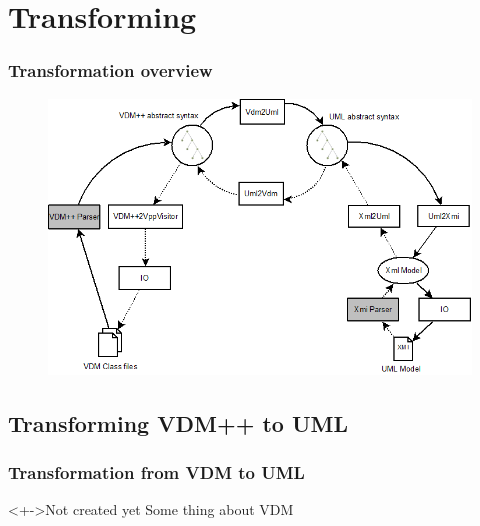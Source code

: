 
\section{Transforming}
%
%
\frame
{
  \frametitle{Transformation overview}

\begin{center}
\begin{figure}
\includegraphics[width=\textwidth]{images/OverviewOverMapping.png}
\end{figure}
\end{center}
}
\subsection{Transforming VDM++ to UML}

%
%
\frame
{
  \frametitle{Transformation from VDM to UML}

\begin{center}
	\begin{block}<+->{Not created yet}
	Some thing about VDM
	\end{block}

\end{center}
}


